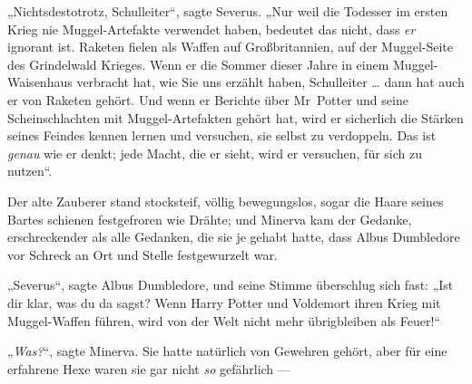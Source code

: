 „Nichtsdestotrotz, Schulleiter“, sagte Severus.
„Nur weil die Todesser im ersten Krieg nie Muggel-Artefakte verwendet haben, bedeutet das nicht, dass \emph{er} ignorant ist. Raketen fielen als Waffen auf Großbritannien, auf der Muggel-Seite des Grindelwald Krieges. Wenn er die Sommer dieser Jahre in einem Muggel-Waisenhaus verbracht hat, wie Sie uns erzählt haben, Schulleiter … dann hat auch er von Raketen gehört. Und wenn er Berichte über Mr~Potter und seine Scheinschlachten mit Muggel-Artefakten gehört hat, wird er sicherlich die Stärken seines Feindes kennen lernen und versuchen, sie selbst zu verdoppeln. Das ist \emph{genau} wie er denkt; jede Macht, die er sieht, wird er versuchen, für sich zu nutzen“.

Der alte Zauberer stand stocksteif, völlig bewegungslos, sogar die Haare seines Bartes schienen festgefroren wie Drähte; und Minerva kam der Gedanke, erschreckender als alle Gedanken, die sie je gehabt hatte, dass Albus Dumbledore vor Schreck an Ort und Stelle festgewurzelt war.

„Severus“, sagte Albus Dumbledore, und seine Stimme überschlug sich fast:
„Ist dir klar, was du da sagst? Wenn Harry Potter und Voldemort ihren Krieg mit Muggel-Waffen führen, wird von der Welt nicht mehr übrigbleiben als Feuer!“

„\emph{Was?}“, sagte Minerva. Sie hatte natürlich von Gewehren gehört, aber für eine erfahrene Hexe waren sie gar nicht \emph{so} gefährlich —

